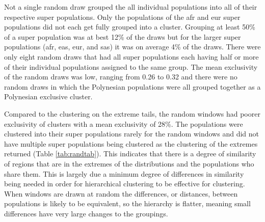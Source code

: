 \documentclass[]{report}
\begin{document}
Not a single random draw grouped the all individual populations into all
of their respective super populations. Only the populations of the
\gls{afr} and \gls{eur} super populations did not each get fully grouped
into a cluster. Grouping at least 50\% of a super population was at best
12\% of the draws but for the larger super populations (\gls{afr},
\gls{eas}, \gls{eur}, and \gls{sas}) it was on average 4\% of the draws.
There were only eight random draws that had all super populations each
having half or more of their individual populations assigned to the same
group. The mean exclusivity of the random draws was low, ranging from
0.26 to 0.32 and there were no random draws in which the Polynesian
populations were all grouped together as a Polynesian exclusive cluster.

Compared to the clustering on the extreme tails, the random windows had
poorer exclusivity of clusters with a mean exclusivity of 28\%. The
populations were clustered into their super populations rarely for the
random windows and did not have multiple super populations being
clustered as the clustering of the extremes returned (Table
\ref{tab:randtab}). This indicates that there is a degree of similarity
of regions that are in the extremes of the distributions and the
populations who share them. This is largely due a minimum degree of
differences in similarity being needed in order for hierarchical
clustering to be effective for clustering. When windows are drawn at
random the differences, or distances, between populations is likely to
be equivalent, so the hierarchy is flatter, meaning small differences
have very large changes to the groupings.
\end{document}
